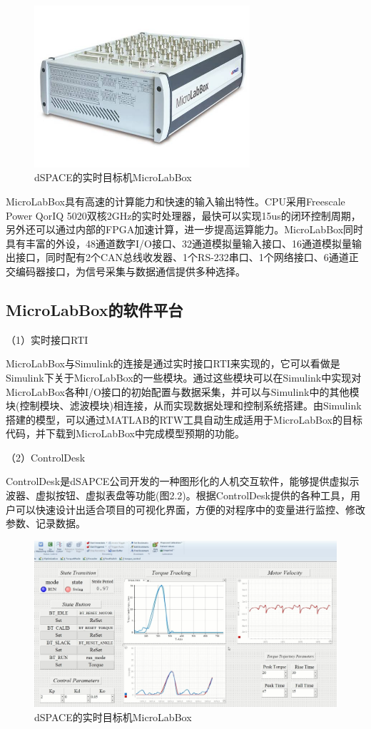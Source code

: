 \begin{figure}[htb]
    \includegraphics[width=8cm]{fig/f21.jpeg}
    \caption{dSPACE的实时目标机MicroLabBox}
    \label{fig:mark}
\end{figure}

MicroLabBox具有高速的计算能力和快速的输入输出特性。CPU采用Freescale Power QorIQ 5020双核2GHz的实时处理器，最快可以实现15us的闭环控制周期，另外还可以通过内部的FPGA加速计算，进一步提高运算能力。MicroLabBox同时具有丰富的外设，48通道数字I/O接口、32通道模拟量输入接口、16通道模拟量输出接口，同时配有2个CAN总线收发器、1个RS-232串口、1个网络接口、6通道正交编码器接口，为信号采集与数据通信提供多种选择。

\subsection{MicroLabBox的软件平台}
（1）实时接口RTI

MicroLabBox与Simulink的连接是通过实时接口RTI来实现的，它可以看做是Simulink下关于MicroLabBox的一些模块。通过这些模块可以在Simulink中实现对MicroLabBox各种I/O接口的初始配置与数据采集，并可以与Simulink中的其他模块(控制模块、滤波模块)相连接，从而实现数据处理和控制系统搭建。由Simulink搭建的模型，可以通过MATLAB的RTW工具自动生成适用于MicroLabBox的目标代码，并下载到MicroLabBox中完成模型预期的功能。

（2）ControlDesk

ControlDesk是dSAPCE公司开发的一种图形化的人机交互软件，能够提供虚拟示波器、虚拟按钮、虚拟表盘等功能(图2.2)。根据ControlDesk提供的各种工具，用户可以快速设计出适合项目的可视化界面，方便的对程序中的变量进行监控、修改参数、记录数据。

\begin{figure}[htb]
    \includegraphics[width=14cm]{fig/f22.jpg}
    \caption{dSPACE的实时目标机MicroLabBox}
    \label{fig:mark}
\end{figure}

